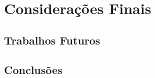 \chapter{Considerações Finais}
\label{cap-conclusao}

\section{Trabalhos Futuros}

\section{Conclusões}
